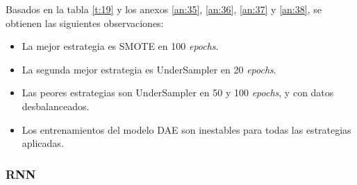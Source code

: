 Basados en la tabla \ref{t:19} y los anexos \ref{an:35}, \ref{an:36}, \ref{an:37} y \ref{an:38}, se obtienen las siguientes observaciones:
\begin{itemize}
	\item La mejor estrategia es SMOTE en 100 \textit{epochs}.
	\item La segunda mejor estrategia es UnderSampler en 20 \textit{epochs}.
	\item Las peores estrategias son UnderSampler en 50 y 100 \textit{epochs}, y con datos desbalanceados.
	\item Los entrenamientos del modelo DAE son inestables para todas las estrategias aplicadas.
\end{itemize}

\subsubsection{RNN}
